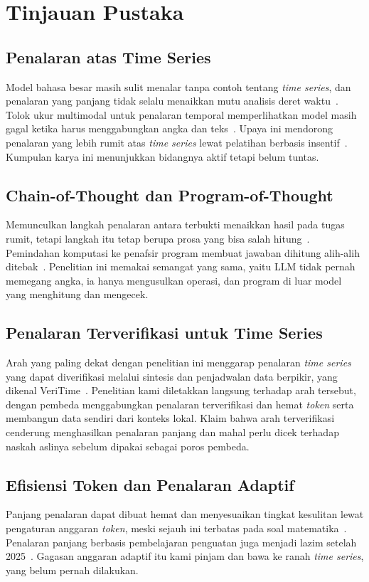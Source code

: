 \documentclass[10pt,a4paper,twocolumn]{article}
\begin{document}
\section{Tinjauan Pustaka}

\subsection{Penalaran atas Time Series}
Model bahasa besar masih sulit menalar tanpa contoh tentang \textit{time
series}, dan penalaran yang panjang tidak selalu menaikkan mutu analisis deret
waktu~\cite{merrill2024}. Tolok ukur multimodal untuk penalaran temporal
memperlihatkan model masih gagal ketika harus menggabungkan angka dan
teks~\cite{mtbench2025}. Upaya ini mendorong penalaran yang lebih rumit atas
\textit{time series} lewat pelatihan berbasis insentif~\cite{timeomni2026}.
Kumpulan karya ini menunjukkan bidangnya aktif tetapi belum tuntas.

\subsection{Chain-of-Thought dan Program-of-Thought}
Memunculkan langkah penalaran antara terbukti menaikkan hasil pada tugas rumit,
tetapi langkah itu tetap berupa prosa yang bisa salah hitung~\cite{cot2022}.
Pemindahan komputasi ke penafsir program membuat jawaban dihitung alih-alih
ditebak~\cite{pal2023}. Penelitian ini memakai semangat yang sama, yaitu LLM
tidak pernah memegang angka, ia hanya mengusulkan operasi, dan program di luar
model yang menghitung dan mengecek.

\subsection{Penalaran Terverifikasi untuk Time Series}
Arah yang paling dekat dengan penelitian ini menggarap penalaran \textit{time
series} yang dapat diverifikasi melalui sintesis dan penjadwalan data berpikir,
yang dikenal VeriTime~\cite{veritime2026}. Penelitian kami diletakkan langsung
terhadap arah tersebut, dengan pembeda menggabungkan penalaran terverifikasi dan
hemat \textit{token} serta membangun data sendiri dari konteks lokal. Klaim
bahwa arah terverifikasi cenderung menghasilkan penalaran panjang dan mahal
perlu dicek terhadap naskah aslinya sebelum dipakai sebagai poros pembeda.

\subsection{Efisiensi Token dan Penalaran Adaptif}
Panjang penalaran dapat dibuat hemat dan menyesuaikan tingkat kesulitan lewat
pengaturan anggaran \textit{token}, meski sejauh ini terbatas pada soal
matematika~\cite{selfbudgeter2025}. Penalaran panjang berbasis pembelajaran
penguatan juga menjadi lazim setelah 2025~\cite{deepseekr1}. Gagasan anggaran
adaptif itu kami pinjam dan bawa ke ranah \textit{time series}, yang belum
pernah dilakukan.
\end{document}
